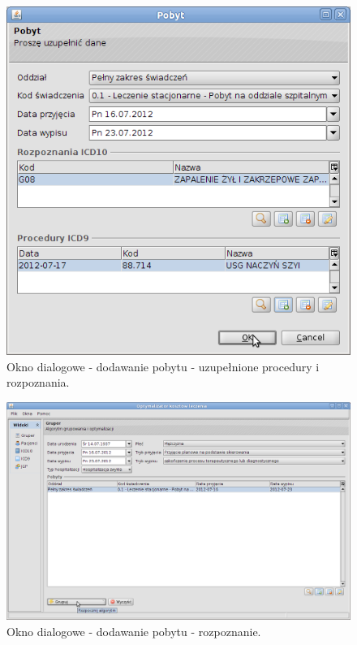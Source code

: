 \begin{figure}%
\centering
\includegraphics[scale=0.4]{images/gruper7}
\caption[Widok grupera]{Okno dialogowe - dodawanie pobytu - uzupełnione procedury i rozpoznania.}
\label{img:gruper7}
\end{figure}

\begin{figure}%
\centering
\includegraphics[scale=0.4]{images/gruper8}
\caption[Widok grupera]{Okno dialogowe - dodawanie pobytu - rozpoznanie.}
\label{img:gruper8}
\end{figure}

